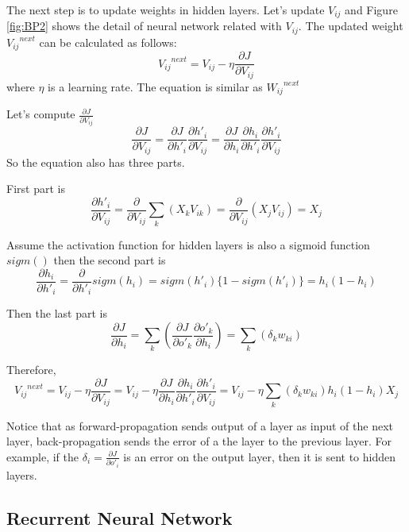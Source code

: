 \documentclass[draft,dvipsnames]{drexel-thesis}
\begin{document}
\begin{thesis}
The next step is to update weights in hidden layers. Let's update $V_{ij}$ and Figure \ref{fig:BP2} shows the detail of neural network related with $V_{ij}$. The updated weight ${{V_{ij}}^{next}}$ can be calculated as follows:
$${{V_{ij}}^{next}}=V_{ij} - \eta\frac{\partial J}{\partial V_{ij}}$$ where $\eta$ is a learning rate. The equation is similar as ${{W_{ij}}^{next}}$

Let's compute $\frac{\partial J}{\partial V_{ij}}$
$$
\frac{\partial J}{\partial V_{ij}}
= \frac{\partial J}{\partial h'_i}\frac{\partial h'_i}{\partial V_{ij}}
= \frac{\partial J}{\partial h_i}\frac{\partial h_i}{\partial h'_i}\frac{\partial h'_i}{\partial V_{ij}}
$$
So the equation also has three parts.

First part is
$$
\frac{\partial h'_i}{\partial V_{ij}}
= \frac{\partial}{\partial V_{ij}}\sum_k(X_kV_{ik})
= \frac{\partial}{\partial V_{ij}}(X_jV_{ij})
= X_j
$$

Assume the activation function for hidden layers is also a sigmoid function $sigm()$ then the second part is
$$
\frac{\partial h_i}{\partial h'_i}
= \frac{\partial}{\partial h'_i}sigm(h_i)
= sigm(h'_i)\{1-sigm(h'_i)\}
= h_i(1-h_i)
$$

Then the last part is
$$
\frac{\partial J}{\partial h_i}
= \sum_k(\frac{\partial J}{\partial o'_k}\frac{\partial o'_k}{\partial h_i})
= \sum_k(\delta_kw_{ki})
$$

Therefore,
$$
{{V_{ij}}^{next}}
= V_{ij} - \eta\frac{\partial J}{\partial V_{ij}}
= V_{ij} - \eta\frac{\partial J}{\partial h_i}\frac{\partial h_i}{\partial h'_i}\frac{\partial h'_i}{\partial V_{ij}}
= V_{ij} - \eta\sum_k(\delta_kw_{ki})h_i(1-h_i)X_j
$$

Notice that as forward-propagation sends output of a layer as input of the next layer, back-propagation sends the error of a the layer to the previous layer. For example, if the $\delta_i=\frac{\partial J}{\partial o'_i}$ is an error on the output layer, then it is sent to hidden layers.




\subsection{Recurrent Neural Network}\label{subsec:RNN}


\end{thesis}
\end{document}
